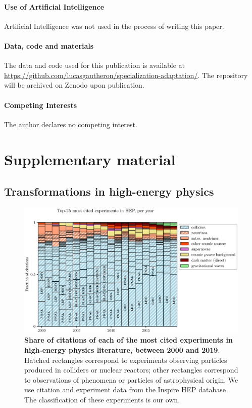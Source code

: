 \documentclass{article}
\begin{document}
\paragraph{Use of Artificial Intelligence}{Artificial Intelligence was not used in the process of writing this paper.}

\paragraph{Data, code and materials}{The data and code used for this publication is available at \url{https://github.com/lucasgautheron/specialization-adaptation/}. The repository will be archived on Zenodo upon publication.}

\paragraph{Competing Interests}{The author declares no competing interest.}

\printbibliography

\newpage

\appendix

\section{Supplementary material}

\subsection{\label{appendix:landscape}Transformations in high-energy physics}

\begin{figure}[H]
    \centering
    \includegraphics[width=\textwidth]{plots/Fig8.eps}
    \caption{\textbf{Share of citations of each of the most cited experiments in high-energy physics literature, between 2000 and 2019}. Hatched rectangles correspond to experiments observing particles produced in colliders or nuclear reactors; other rectangles correspond to observations of phenomena or particles of astrophysical origin. We use citation and experiment data from the Inspire HEP database \citep{InspireAPI}. The classification of these experiments is our own. }
    \label{fig:experiments}
\end{figure}
\end{document}
